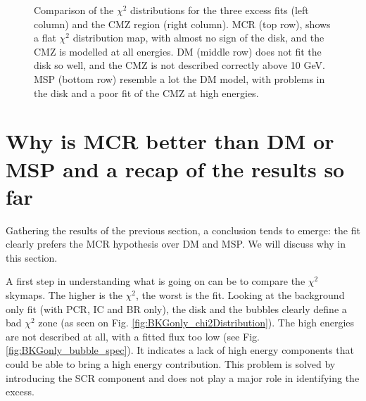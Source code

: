 \begin{figure}[H]
\begin{minipage}[h]{0.45\textwidth}
  	\subcaption{}
  	\label{fig:MSP_only_CMZ}
  \end{minipage}
  \caption{Comparison of the $\chi^2$ distributions for the three excess fits (left column) and the CMZ region (right column). MCR (top row), shows a flat $\chi^2$ distribution map, with almost no sign of the disk, and the CMZ is modelled at all energies. DM (middle row) does not fit the disk so well, and the CMZ is not described correctly above 10 GeV. MSP (bottom row) resemble a lot the DM model, with problems in the disk and a poor fit of the CMZ at high energies.}
  \label{fig:Excess_comp_comparison}
\end{figure}





\newpage
\section{Why is MCR better than DM or MSP and a recap of the results so far}
%

Gathering the results of the previous section, a conclusion tends to emerge: the fit clearly prefers the MCR hypothesis over DM and MSP. We will discuss why in this section.

A first step in understanding what is going on can be to compare the $\chi^2$ skymaps. The higher is the $\chi^2$, the worst is the fit. Looking at the background only fit (with PCR, IC and BR only), the disk and the bubbles clearly define a bad $\chi^2$ zone (as seen on Fig. \ref{fig:BKGonly_chi2Distribution}). The high energies are not described at all, with a fitted flux too low (see Fig. \ref{fig:BKGonly_bubble_spec}). It indicates a lack of high energy components that could be able to bring a high energy contribution. This problem is solved by introducing the SCR component and does not play a major role in identifying the excess.


